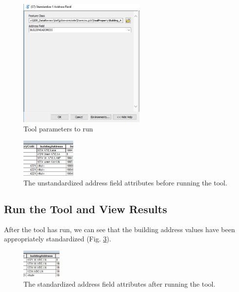 \documentclass[openany]{book}
\theoremstyle{definition}
\theoremstyle{definition}
\theoremstyle{definition}
\theoremstyle{remark}
\begin{document}
\begin{figure}[H]

{\centering \includegraphics[width=2.48in,]{figures/std1-toolparams} 

}

\caption{Tool parameters to run}\label{fig:std1params}
\end{figure}\begin{figure}[H]

{\centering \includegraphics[width=1.06in,]{figures/std1-before} 

}

\caption{The unstandardized address field attributes before running the tool.}\label{fig:std1before}
\end{figure}

\subsection{Run the Tool and View
Results}\label{run-the-tool-and-view-results-6}

After the tool has run, we can see that the building address values have
been appropriately standardized (Fig. \ref{fig:std1after}).

\begin{figure}[H]

{\centering \includegraphics[width=0.77in,]{figures/std1-after} 

}

\caption{The standardized address field attributes after running the tool.}\label{fig:std1after}
\end{figure}
\end{document}
